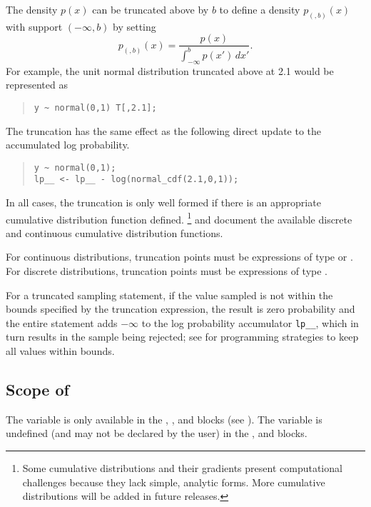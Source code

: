 The density $p(x)$ can be truncated above by $b$ to define a density
$p_{(,b)}(x)$ with support $(-\infty,b)$ by setting
\[
p_{(,b)}(x) = \frac{p(x)}
                    {\int_{-\infty}^b p(x') \, dx'}.
\]
For example, the unit normal distribution truncated above at 2.1 would
be represented as
%
\begin{quote}
\begin{Verbatim} 
y ~ normal(0,1) T[,2.1];
\end{Verbatim}
\end{quote}
% 
The truncation has the same effect as the following direct update to
the accumulated log probability.
%
\begin{quote}
\begin{Verbatim}[fontsize=\small]
y ~ normal(0,1);
lp__ <- lp__ - log(normal_cdf(2.1,0,1));
\end{Verbatim}
\end{quote}

In all cases, the truncation is only well formed if there is an
appropriate cumulative distribution function defined.%
%
\footnote{Some cumulative distributions and their gradients present
  computational challenges because they lack simple, analytic forms.
  More cumulative distributions will be added in future releases.}
%
 and
 document the available discrete
and continuous cumulative distribution functions.

For continuous distributions, truncation points must be expressions of
type  or .  For discrete distributions, truncation
points must be expressions of type .

For a truncated sampling statement, if the value sampled is not within
the bounds specified by the truncation expression, the result is zero
probability and the entire statement adds $-\infty$ to the log
probability accumulator \Verb|lp__|, which in turn results in the
sample being rejected; see  for
programming strategies to keep all values within bounds.



\subsection{Scope of\, }

The variable  is only available in the ,
, and  blocks (see
).  The variable  is undefined (and
may not be declared by the user) in the ,  and  blocks.

